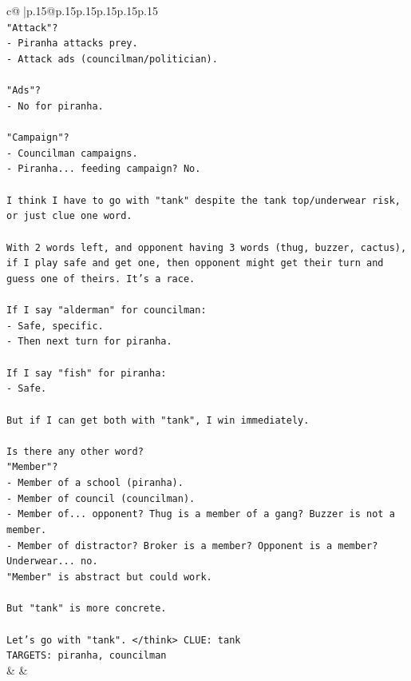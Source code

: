 \documentclass{article}
\begin{document}
{\begin{supertabular}{c@{$\;$}|p{.15\linewidth}@{}p{.15\linewidth}p{.15\linewidth}p{.15\linewidth}p{.15\linewidth}p{.15\linewidth}}
{{{\\ 
\texttt{"Attack"?} \\
\texttt{{-} Piranha attacks prey.} \\
\texttt{{-} Attack ads (councilman/politician).} \\
\\ 
\texttt{"Ads"?} \\
\texttt{{-} No for piranha.} \\
\\ 
\texttt{"Campaign"?} \\
\texttt{{-} Councilman campaigns.} \\
\texttt{{-} Piranha... feeding campaign? No.} \\
\\ 
\texttt{I think I have to go with "tank" despite the tank top/underwear risk, or just clue one word.} \\
\\ 
\texttt{With 2 words left, and opponent having 3 words (thug, buzzer, cactus), if I play safe and get one, then opponent might get their turn and guess one of theirs. It's a race.} \\
\\ 
\texttt{If I say "alderman" for councilman:} \\
\texttt{{-} Safe, specific.} \\
\texttt{{-} Then next turn for piranha.} \\
\\ 
\texttt{If I say "fish" for piranha:} \\
\texttt{{-} Safe.} \\
\\ 
\texttt{But if I can get both with "tank", I win immediately.} \\
\\ 
\texttt{Is there any other word?} \\
\texttt{"Member"?} \\
\texttt{{-} Member of a school (piranha).} \\
\texttt{{-} Member of council (councilman).} \\
\texttt{{-} Member of... opponent? Thug is a member of a gang? Buzzer is not a member.} \\
\texttt{{-} Member of distractor? Broker is a member? Opponent is a member? Underwear... no.} \\
\texttt{"Member" is abstract but could work.} \\
\\ 
\texttt{But "tank" is more concrete.} \\
\\ 
\texttt{Let's go with "tank". </think> CLUE: tank} \\
\texttt{TARGETS: piranha, councilman} \\
            }
        }
    }
    & & \\ \\


\end{supertabular}}
\end{document}
